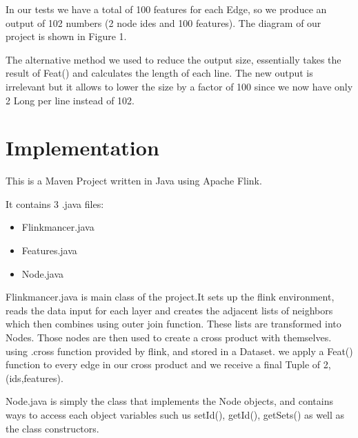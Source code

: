 In our tests we have a total of 100 features for each Edge, so we produce an output of 102 numbers (2 node ides and 100 features). The diagram of our project is shown in Figure 1.

The alternative method we used to reduce the output size, essentially takes the result of Feat() and calculates the length of each line. The new output is irrelevant but it allows to lower the size by a factor of 100 since we now have only 2 Long per line instead of 102.



\section{Implementation}

This is a Maven Project written in Java using Apache Flink. 

It contains 3 .java files:
\begin{itemize} 
\item Flinkmancer.java
\item Features.java
\item Node.java
\end{itemize}

Flinkmancer.java is main class of the project.It sets up the flink environment, reads the data input for each layer and creates the adjacent lists of neighbors which then combines using outer join function. These lists are transformed into Nodes. Those nodes are then used to create a cross product with themselves. using .cross function provided by flink, and stored in a Dataset. we apply a Feat() function to every edge in our cross product and we receive a final Tuple of 2, (ids,features). \newline

Node.java is simply the class that implements the Node objects, and contains ways to access each object variables such us setId(), getId(), getSets() as well as the class constructors. \newline

